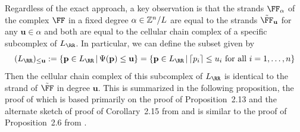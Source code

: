 \documentclass{amsart}
\begin{document}
Regardless of the exact approach, a key observation is that the strands $\FF_{\alpha}$ of the complex $\FF$ in a fixed degree $\alpha\in \mathbb Z^n/L$ are equal to the strands $\tilde \FF_{\mathbf{u}}$ for any $\mathbf{u}\in \alpha$ and both are equal to the cellular chain complex of a specific subcomplex of $L_{\RR}$. In particular, we can define the subset given by
\[(L_{\RR})_{\leq \mathbf{u}}:= \{\mathbf{p}\in L_{\RR} \,|\, \Psi(\mathbf{p})\leq \mathbf{u}\} = \{\mathbf{p}\in L_{\RR} \,|\, \lceil p_i\rceil \leq u_i\text{ for all } i=1,\ldots,n\}\]
Then the cellular chain complex of this subcomplex of $L_{\RR}$ is identical to the strand of $\tilde \FF$ in degree $\mathbf{u}$. This is summarized in the following proposition, the proof of which is based primarily on the proof of Proposition~2.13 and the alternate sketch of proof of Corollary~2.15 from \cite{BCHSY} and is similar to the proof of Proposition~2.6 from \cite{BH25}.
\end{document}
